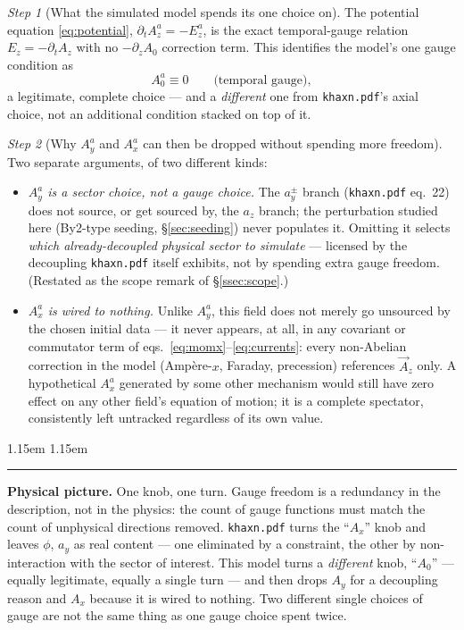 \documentclass[11pt,a4paper]{article}
\numberwithin{equation}{section}
\theoremstyle{remark}
\newtheorem{step}{Step}[subsection]
\newenvironment{intuition}%
{\par\medskip\noindent
 \begin{list}{}{\leftmargin 1.15em \rightmargin 1.15em \listparindent 0pt
 \itemindent 0pt \parsep 2pt \topsep 2pt}\item\relax
 \small\textcolor{intu}{\rule[-0.6ex]{2.6pt}{2.4ex}}\hspace{0.55em}%
 \textcolor{intu}{\textbf{Physical picture.}}\hspace{0.5em}\ignorespaces}%
{\end{list}\medskip}
\begin{document}
\begin{step}[What the simulated model spends its one choice on]
The potential equation \eqref{eq:potential}, $\partial_tA_z^a=-E_z^a$, is
the exact temporal-gauge relation $E_z=-\partial_tA_z$ with no
$-\partial_zA_0$ correction term. This identifies the model's one gauge
condition as
\begin{equation}
A_0^a\equiv0 \qquad\text{(temporal gauge)},
\end{equation}
a legitimate, complete choice --- and a \emph{different} one from
\texttt{khaxn.pdf}'s axial choice, not an additional condition stacked on
top of it.
\end{step}

\begin{step}[Why $A_y^a$ and $A_x^a$ can then be dropped without spending
more freedom]
Two separate arguments, of two different kinds:
\begin{itemize}
\item \emph{$A_y^a$ is a sector choice, not a gauge choice.} The
$a_y^\pm$ branch (\texttt{khaxn.pdf} eq.~22) does not source, or get
sourced by, the $a_z$ branch; the perturbation studied here (By2-type
seeding, \S\ref{sec:seeding}) never populates it. Omitting it selects
\emph{which already-decoupled physical sector to simulate} --- licensed
by the decoupling \texttt{khaxn.pdf} itself exhibits, not by spending
extra gauge freedom. (Restated as the scope remark of
\S\ref{ssec:scope}.)
\item \emph{$A_x^a$ is wired to nothing.} Unlike $A_y^a$, this field
does not merely go unsourced by the chosen initial data --- it never
appears, at all, in any covariant or commutator term of
eqs.~\eqref{eq:momx}--\eqref{eq:currents}: every non-Abelian correction
in the model (Amp\`ere-$x$, Faraday, precession) references $\vec A_z$
only. A hypothetical $A_x^a$ generated by some other mechanism would
still have zero effect on any other field's equation of motion; it is a
complete spectator, consistently left untracked regardless of its own
value.
\end{itemize}
\end{step}

\begin{intuition}
One knob, one turn. Gauge freedom is a redundancy in the description,
not in the physics: the count of gauge functions must match the count of
unphysical directions removed. \texttt{khaxn.pdf} turns the ``$A_x$''
knob and leaves $\phi$, $a_y$ as real content --- one eliminated by a
constraint, the other by non-interaction with the sector of interest.
This model turns a \emph{different} knob, ``$A_0$'' --- equally
legitimate, equally a single turn --- and then drops $A_y$ for a
decoupling reason and $A_x$ because it is wired to nothing. Two
different single choices of gauge are not the same thing as one gauge
choice spent twice.
\end{intuition}
\end{document}
